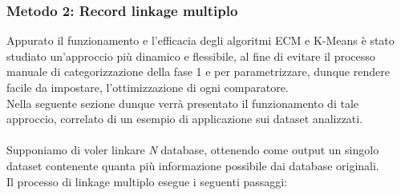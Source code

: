 \documentclass[a4paper,12pt]{article}
\begin{document}
\subsubsection{Metodo 2: Record linkage multiplo}
Appurato il funzionamento e l'efficacia degli algoritmi ECM e K-Means è stato studiato un'approccio più dinamico e flessibile, al fine di evitare il processo manuale di categorizzazione della fase 1 e per parametrizzare, dunque rendere facile da impostare, l'ottimizzazione di ogni comparatore.\\
Nella seguente sezione dunque verrà presentato il funzionamento di tale approccio, correlato di un esempio di applicazione sui dataset analizzati.\\\\
Supponiamo di voler linkare \textit{N} database, ottenendo come output un singolo dataset contenente quanta più informazione possibile dai database originali.\\
Il processo di linkage multiplo esegue i seguenti passaggi:
\end{document}
